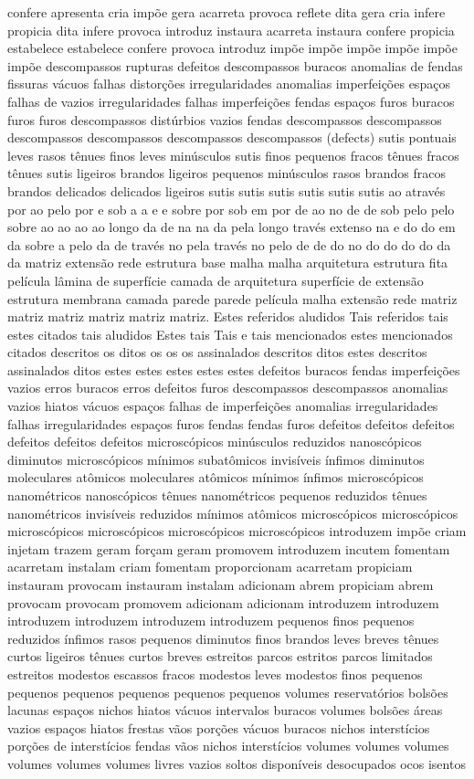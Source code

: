 confere apresenta cria impõe gera acarreta provoca reflete dita gera cria infere propicia dita infere provoca introduz instaura acarreta instaura confere propicia estabelece estabelece confere provoca introduz impõe impõe impõe impõe impõe impõe descompassos rupturas defeitos descompassos buracos anomalias de fendas fissuras vácuos falhas distorções irregularidades anomalias imperfeições espaços falhas de vazios irregularidades falhas imperfeições fendas espaços furos buracos furos furos descompassos distúrbios vazios fendas descompassos descompassos descompassos descompassos descompassos descompassos (defects) sutis pontuais leves rasos tênues finos leves minúsculos sutis finos pequenos fracos tênues fracos tênues sutis ligeiros brandos ligeiros pequenos minúsculos rasos brandos fracos brandos delicados delicados ligeiros sutis sutis sutis sutis sutis sutis ao através por ao pelo por e sob a a e e sobre por sob em por de ao no de de sob pelo pelo sobre ao ao ao ao longo da de na na da pela longo través extenso na e do do em da sobre a pelo da de través no pela través no pelo de de do no do do do do da da matriz extensão rede estrutura base malha malha arquitetura estrutura fita película lâmina de superfície camada de arquitetura superfície de extensão estrutura membrana camada parede parede película malha extensão rede matriz matriz matriz matriz matriz matriz. Estes referidos aludidos Tais referidos tais estes citados tais aludidos Estes tais Tais e tais mencionados estes mencionados citados descritos os ditos os os os assinalados descritos ditos estes descritos assinalados ditos estes estes estes estes estes defeitos buracos fendas imperfeições vazios erros buracos erros defeitos furos descompassos descompassos anomalias vazios hiatos vácuos espaços falhas de imperfeições anomalias irregularidades falhas irregularidades espaços furos fendas fendas furos defeitos defeitos defeitos defeitos defeitos defeitos microscópicos minúsculos reduzidos nanoscópicos diminutos microscópicos mínimos subatômicos invisíveis ínfimos diminutos moleculares atômicos moleculares atômicos mínimos ínfimos microscópicos nanométricos nanoscópicos tênues nanométricos pequenos reduzidos tênues nanométricos invisíveis reduzidos mínimos atômicos microscópicos microscópicos microscópicos microscópicos microscópicos microscópicos introduzem impõe criam injetam trazem geram forçam geram promovem introduzem incutem fomentam acarretam instalam criam fomentam proporcionam acarretam propiciam instauram provocam instauram instalam adicionam abrem propiciam abrem provocam provocam promovem adicionam adicionam introduzem introduzem introduzem introduzem introduzem introduzem pequenos finos pequenos reduzidos ínfimos rasos pequenos diminutos finos brandos leves breves tênues curtos ligeiros tênues curtos breves estreitos parcos estritos parcos limitados estreitos modestos escassos fracos modestos leves modestos finos pequenos pequenos pequenos pequenos pequenos pequenos volumes reservatórios bolsões lacunas espaços nichos hiatos vácuos intervalos buracos volumes bolsões áreas vazios espaços hiatos frestas vãos porções vácuos buracos nichos interstícios porções de interstícios fendas vãos nichos interstícios volumes volumes volumes volumes volumes volumes livres vazios soltos disponíveis desocupados ocos isentos 